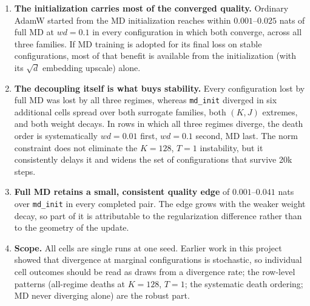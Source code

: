 \documentclass[11pt,a4paper]{article}
\newcommand{\code}[1]{\texttt{#1}}
\begin{document}
\begin{enumerate}[leftmargin=1.6em]
\item \textbf{The initialization carries most of the converged quality.}
Ordinary AdamW started from the MD initialization reaches within
$0.001$--$0.025$ nats of full MD at $wd{=}0.1$ in every configuration in
which both converge, across all three families. If MD training is adopted
for its final loss on stable configurations, most of that benefit is
available from the initialization (with its $\sqrt d$ embedding upscale)
alone.

\item \textbf{The decoupling itself is what buys stability.} Every
configuration lost by full MD was lost by all three regimes, whereas
\code{md\_init} diverged in six additional cells spread over both surrogate
families, both $(K,J)$ extremes, and both weight decays. In rows in which
all three regimes diverge, the death order is systematically $wd{=}0.01$
first, $wd{=}0.1$ second, MD last. The norm constraint does not eliminate
the $K=128$, $T=1$ instability, but it consistently delays it and widens the
set of configurations that survive 20k steps.

\item \textbf{Full MD retains a small, consistent quality edge} of
$0.001$--$0.041$ nats over \code{md\_init} in every completed pair. The edge
grows with the weaker weight decay, so part of it is attributable to the
regularization difference rather than to the geometry of the update.

\item \textbf{Scope.} All cells are single runs at one seed. Earlier work in
this project showed that divergence at marginal configurations is
stochastic, so individual cell outcomes should be read as draws from a
divergence rate; the row-level patterns (all-regime deaths at $K{=}128$,
$T{=}1$; the systematic death ordering; MD never diverging alone) are the
robust part.
\end{enumerate}
\end{document}
